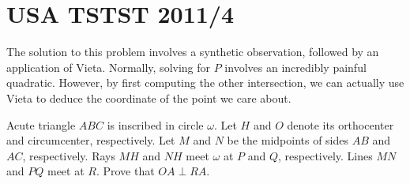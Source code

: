 \section{USA TSTST 2011/4}
\label{exam:2011tstst4}
The solution to this problem involves a synthetic observation, followed by an application of Vieta.   Normally, solving for $P$ involves an incredibly painful quadratic.  However, by first computing the other intersection, we can actually use Vieta to deduce the coordinate of the point we care about.
\secps
\begin{problem}
  Acute triangle $ABC$ is inscribed in circle $\omega$. Let $H$ and $O$ denote its orthocenter and circumcenter, respectively. Let $M$ and $N$ be the midpoints of sides $AB$ and $AC$, respectively. Rays $MH$ and $NH$ meet $\omega$ at $P$ and $Q$, respectively. Lines $MN$ and $PQ$ meet at $R$. Prove that $OA \perp RA$.
\end{problem}


